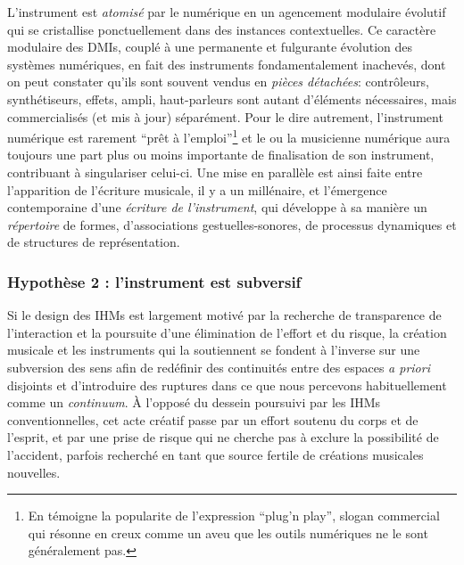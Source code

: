 \noindent L'instrument est \textit{atomisé} par le numérique en un agencement modulaire évolutif qui se cristallise ponctuellement dans des instances contextuelles. Ce caractère modulaire des \glspl{DMI}, couplé à une permanente et fulgurante évolution des systèmes numériques, en fait des instruments fondamentalement inachevés, dont on peut constater qu'ils sont souvent vendus en \textit{pièces détachées}: contrôleurs, synthétiseurs, effets, ampli, haut-parleurs sont autant d'éléments nécessaires, mais commercialisés (et mis à jour) séparément. Pour le dire autrement, l'instrument numérique est rarement ``prêt à l'emploi''\footnote{En témoigne la popularite de l'expression ``plug'n play'', slogan commercial qui résonne en creux comme un aveu que les outils numériques ne le sont généralement pas.} et le ou la musicienne numérique aura toujours une part plus ou moins importante de finalisation de son instrument, contribuant à singulariser celui-ci. Une mise en parallèle est ainsi faite entre l'apparition de l'écriture musicale, il y a un millénaire, et l'émergence contemporaine d'une \textit{écriture de l'instrument}, qui développe à sa manière un \textit{répertoire} de formes, d'associations gestuelles-sonores, de processus dynamiques et de structures de représentation.

\subsubsection*{Hypothèse 2 : l'instrument est subversif}

\noindent Si le design des \glspl{IHM} est largement motivé par la recherche de transparence de l'interaction et la poursuite d'une élimination de l'effort et du risque, la création musicale et les instruments qui la soutiennent se fondent à l'inverse sur une subversion des sens afin de redéfinir des continuités entre des espaces \textit{a priori} disjoints et d'introduire des ruptures dans ce que nous percevons habituellement comme un \textit{continuum}. À l'opposé du dessein poursuivi par les \glspl{IHM} conventionnelles, cet acte créatif passe par un effort soutenu du corps et de l'esprit, et par une prise de risque qui ne cherche pas à exclure la possibilité de l'accident, parfois recherché en tant que source fertile de créations musicales nouvelles.


